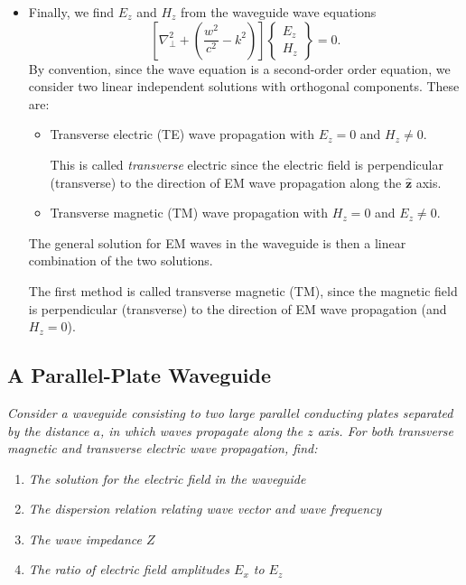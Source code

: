 \documentclass[11pt, a4paper]{article}
\renewcommand{\vec}[1]{\bm{#1}} %
\newcommand{\uvec}[1]{\hat{\vec{#1}}} %
\renewcommand{\laplacian}{\nabla^{2}}
\begin{document}
\begin{itemize}
	\item Finally, we find $ E_{z} $ and $ H_{z} $ from the waveguide wave equations
	\begin{equation*}
		\left[\laplacian_{\perp} + \left(\frac{w^{2}}{c^{2}} - k^{2}\right)\right]
		\begin{Bmatrix}
		E_{z}\\
		H_{z}
		\end{Bmatrix}
		= 0.
	\end{equation*}
	By convention, since the wave equation is a second-order order equation, we consider two linear independent solutions with orthogonal components. These are:
	\begin{itemize}
		\item Transverse electric (TE) wave propagation with $ E_{z} = 0 $ and $ H_{z} \neq 0 $. 
		
		This is called \textit{transverse} electric since the electric field is perpendicular (transverse) to the direction of EM wave propagation along the $ \uvec{z} $ axis.
		
		\item Transverse magnetic (TM) wave propagation with $ H_{z} = 0 $ and $ E_{z} \neq 0 $.
	\end{itemize}
	The general solution for EM waves in the waveguide is then a linear combination of the two solutions.
	
	
	
	The first method is called transverse magnetic (TM), since the magnetic field is perpendicular (transverse) to the direction of EM wave propagation (and $ H_{z} = 0 $). 
	
	
\end{itemize}

\subsection{A Parallel-Plate Waveguide}
\textit{Consider a waveguide consisting to two large parallel conducting plates separated by the distance $ a $, in which waves propagate along the $ z $ axis. For both transverse magnetic and transverse electric wave propagation, find:}
\begin{enumerate}
	\item \textit{The solution for the electric field in the waveguide}
	\item \textit{The dispersion relation relating wave vector and wave frequency}
	\item \textit{The wave impedance $ Z $}
	\item \textit{The ratio of electric field amplitudes $ E_{x} $ to $ E_{z} $}
\end{enumerate}
\end{document}
